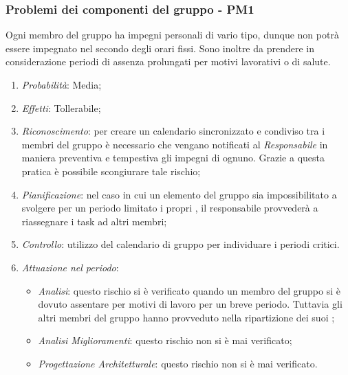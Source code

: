\subsubsection{Problemi dei componenti del gruppo - PM1}
Ogni membro del gruppo ha impegni personali di vario tipo, dunque non potr\`a essere impegnato nel  secondo degli orari fissi. Sono inoltre da prendere in considerazione periodi di assenza prolungati per motivi lavorativi o di salute.
\begin{enumerate}
\item \textit{Probabilit\`a}: Media;
\item \textit{Effetti}: Tollerabile;
\item \textit{Riconoscimento}: per creare un calendario sincronizzato e condiviso tra i membri del gruppo è necessario che vengano notificati al \textit{Responsabile} in maniera preventiva e tempestiva gli impegni di ognuno. Grazie a questa pratica è possibile scongiurare tale rischio;
\item \textit{Pianificazione}: nel caso in cui un elemento del gruppo sia impossibilitato a svolgere per un periodo limitato i propri , il responsabile provveder\`a a riassegnare i task ad altri membri;
\item \textit{Controllo}: utilizzo del calendario di gruppo per individuare i periodi critici.
\item \textit{Attuazione nel periodo}: 
	\begin{itemize}
	\item \textit{Analisi}: questo rischio si è verificato quando un membro del gruppo si è dovuto assentare per motivi di lavoro per un breve periodo. Tuttavia gli altri membri del gruppo hanno provveduto nella ripartizione dei suoi ;
	\item \textit{Analisi Miglioramenti}: questo rischio non si è mai verificato;
	\item \textit{Progettazione Architetturale}: questo rischio non si è mai verificato.
	\end{itemize}
\end{enumerate}

